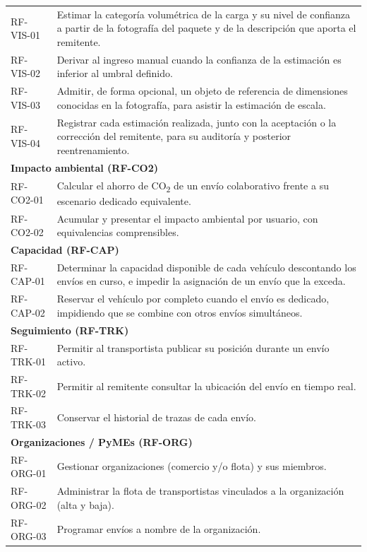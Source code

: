 {\begin{longtable}{p{2.4cm}p{11.2cm}}
    RF-VIS-01 & Estimar la categoría volumétrica de la carga y su nivel de confianza a partir de la fotografía del paquete y de la descripción que aporta el remitente. \\
    RF-VIS-02 & Derivar al ingreso manual cuando la confianza de la estimación es inferior al umbral definido. \\
    RF-VIS-03 & Admitir, de forma opcional, un objeto de referencia de dimensiones conocidas en la fotografía, para asistir la estimación de escala. \\
    RF-VIS-04 & Registrar cada estimación realizada, junto con la aceptación o la corrección del remitente, para su auditoría y posterior reentrenamiento. \\
    \midrule
    \multicolumn{2}{l}{\textbf{Impacto ambiental (RF-CO2)}} \\
    RF-CO2-01 & Calcular el ahorro de CO\textsubscript{2} de un envío colaborativo frente a su escenario dedicado equivalente. \\
    RF-CO2-02 & Acumular y presentar el impacto ambiental por usuario, con equivalencias comprensibles. \\
    \midrule
    \multicolumn{2}{l}{\textbf{Capacidad (RF-CAP)}} \\
    RF-CAP-01 & Determinar la capacidad disponible de cada vehículo descontando los envíos en curso, e impedir la asignación de un envío que la exceda. \\
    RF-CAP-02 & Reservar el vehículo por completo cuando el envío es dedicado, impidiendo que se combine con otros envíos simultáneos. \\
    \midrule
    \multicolumn{2}{l}{\textbf{Seguimiento (RF-TRK)}} \\
    RF-TRK-01 & Permitir al transportista publicar su posición durante un envío activo. \\
    RF-TRK-02 & Permitir al remitente consultar la ubicación del envío en tiempo real. \\
    RF-TRK-03 & Conservar el historial de trazas de cada envío. \\
    \midrule
    \multicolumn{2}{l}{\textbf{Organizaciones / PyMEs (RF-ORG)}} \\
    RF-ORG-01 & Gestionar organizaciones (comercio y/o flota) y sus miembros. \\
    RF-ORG-02 & Administrar la flota de transportistas vinculados a la organización (alta y baja). \\
    RF-ORG-03 & Programar envíos a nombre de la organización. \\

\end{longtable}}
